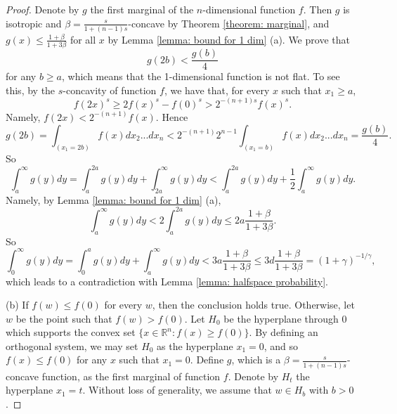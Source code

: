 \documentclass[11pt]{article}
\newcommand{\R}{\mathbb{R}}
\begin{document}
{{{{\begin{proof}
Denote by $g$ the first marginal of the $n$-dimensional function $f$. Then $g$ is isotropic and $\beta=\frac{s}{1+(n-1)s}$-concave by Theorem \ref{theorem: marginal}, and $g(x)\le \frac{1+\beta}{1+3\beta}$ for all $x$ by Lemma \ref{lemma: bound for 1 dim} (a). We prove that
\begin{equation*}
g(2b)<\frac{g(b)}{4}
\end{equation*}
for any $b\ge a$, which means that the 1-dimensional function is not flat.
To see this, by the $s$-concavity of function $f$, we have that, for every $x$ such that $x_1\ge a$,
\begin{equation*}
f(2x)^s\ge 2f(x)^s-f(0)^s>2^{-(n+1)s}f(x)^s.
\end{equation*}
Namely, $f(2x)< 2^{-(n+1)}f(x)$. Hence
\begin{equation*}
g(2b)=\int_{(x_1=2b)}f(x)dx_2...dx_n< 2^{-(n+1)}2^{n-1}\int_{(x_1=b)}f(x)dx_2...dx_n=\frac{g(b)}{4}.
\end{equation*}
So
\begin{equation*}
\int_a^\infty g(y)dy=\int_a^{2a} g(y)dy+\int_{2a}^\infty g(y)dy< \int_a^{2a} g(y)dy+\frac{1}{2}\int_a^{\infty} g(y)dy.
\end{equation*}
Namely, by Lemma \ref{lemma: bound for 1 dim} (a),
\begin{equation*}
\int_a^{\infty} g(y)dy< 2\int_a^{2a} g(y)dy\le 2a\frac{1+\beta}{1+3\beta}.
\end{equation*}
So
\begin{equation*}
\int_0^{\infty} g(y)dy=\int_0^a g(y)dy+\int_a^{\infty} g(y)dy< 3a\frac{1+\beta}{1+3\beta}\le 3d\frac{1+\beta}{1+3\beta}=(1+\gamma)^{-1/\gamma},
\end{equation*}
which leads to a contradiction with Lemma \ref{lemma: halfspace probability}.

(b) If $f(w)\le f(0)$ for every $w$, then the conclusion holds true. Otherwise, let $w$ be the point such that $f(w)> f(0)$. Let $H_0$ be the hyperplane through $0$ which supports the convex set $\{x\in\R^n:f(x)\ge f(0)\}$. By defining an orthogonal system, we may set $H_0$ as the hyperplane $x_1=0$, and so $f(x)\le f(0)$ for any $x$ such that $x_1=0$. Define $g$, which is a $\beta=\frac{s}{1+(n-1)s}$-concave function, as the first marginal of function $f$. Denote by $H_t$ the hyperplane $x_1=t$. Without loss of generality, we assume that $w\in H_b$ with $b>0$.


\end{proof}}}}}
\end{document}
